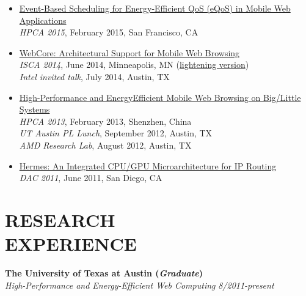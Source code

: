 \documentclass[margin, 9pt]{res} %
\begin{document}
\begin{resume}
\begin{itemize}[leftmargin=*]
	\item \href{https://speakerdeck.com/queeten/event-based-scheduling-for-energy-efficient-quality-of-service-eqos-in-mobile-web-applications}{Event-Based Scheduling for Energy-Efficient QoS (eQoS) in Mobile Web Applications}\\[2pt]
          \textit{HPCA 2015}, February 2015, San Francisco, CA

	\item \href{https://speakerdeck.com/queeten/webcore-architectural-support-for-mobile-web-browsing}{WebCore: Architectural Support for Mobile Web Browsing}\\[2pt]
         \textit{ISCA 2014}, June 2014, Minneapolis, MN (\href{https://speakerdeck.com/queeten/isca-2014-fastforward-session-talk}{lightening version})\\[2pt]
          \textit{Intel invited talk}, July 2014, Austin, TX

	\item \href{https://speakerdeck.com/queeten/little-systems}{High-Performance and EnergyEfficient Mobile Web Browsing on Big/Little Systems}\\[2pt]
          \textit{HPCA 2013}, February 2013, Shenzhen, China\\[2pt]
          \textit{UT Austin PL Lunch}, September 2012, Austin, TX\\[2pt]
          \textit{AMD Research Lab}, August 2012, Austin, TX

	\item \href{https://speakerdeck.com/queeten/gpu-microarchitecture-for-ip-routing}{Hermes: An Integrated CPU/GPU Microarchitecture for IP Routing}\\[2pt]
          \textit{DAC 2011}, June 2011, San Diego, CA
\end{itemize}


\section{RESEARCH\\ EXPERIENCE}

{\large\textbf{The University of Texas at Austin (\textit{Graduate})}}\\

\vspace*{-7pt}
{\large \textit{High-Performance and Energy-Efficient Web Computing}} \hfill\textit{8/2011-present}\\


\end{resume}
\end{document}
